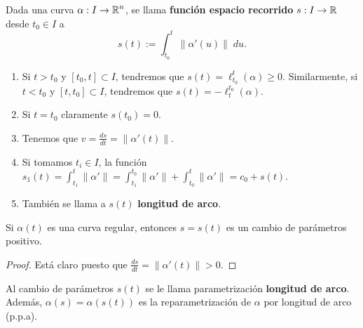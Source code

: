 \begin{definition}
Dada una curva $\displaystyle \alpha : I \to \mathbb{R}^{n} $, se llama \textbf{función espacio recorrido} $\displaystyle s : I \to \mathbb{R} $ desde $\displaystyle t_{0} \in I $ a 
\[s\left(t\right):=\int^{t}_{t_{0}} \|\alpha'\left(u\right)\| \; d u .\]
\end{definition}
\begin{observation}
\begin{enumerate}
	\item Si $\displaystyle t > t_{0} $ y $\displaystyle \left[t_{0}, t\right] \subset I $, tendremos que $\displaystyle s\left(t\right)=\ell^{t}_{t_{0}}\left(\alpha \right)\geq 0 $. Similarmente, si $\displaystyle t < t_{0} $ y $\displaystyle \left[t, t_{0}\right] \subset I $, tendremos que $\displaystyle s\left(t\right)=-\ell^{t_{0}}_{t}\left(\alpha \right) $.
	\item Si $\displaystyle t = t_{0} $ claramente $\displaystyle s\left(t_{0}\right)=0 $.
	\item Tenemos que $\displaystyle v = \frac{d s}{dt}=\|\alpha'\left(t\right)\| $.
	\item Si tomamos $\displaystyle t_{i}\in I $, la función $\displaystyle s_{1}\left(t\right)=\int^{t}_{t_{1}} \|\alpha'\|  = \int^{t_{0}}_{t_{1}} \|\alpha' \| + \int^{t}_{t_{0}} \|\alpha'\| = c_{0} + s\left(t\right) $.
	\item También se llama a $\displaystyle s\left(t\right) $ \textbf{longitud de arco}.
\end{enumerate}
\end{observation}
\begin{lema}
Si $\displaystyle \alpha\left(t\right)  $ es una curva regular, entonces $\displaystyle s = s\left(t\right) $ es un cambio de parámetros positivo.
\end{lema}
\begin{proof}
Está claro puesto que $\displaystyle \frac{d s}{dt}= \|\alpha'\left(t\right)\| > 0 $.
\end{proof}
\begin{definition}
Al cambio de parámetros $\displaystyle s\left(t\right) $ se le llama parametrización \textbf{longitud de arco}. Además, $\displaystyle \alpha\left(s\right)=\alpha\left(s\left(t\right)\right) $ es la reparametrización de $\displaystyle \alpha  $ por longitud de arco (p.p.a).
\end{definition}


